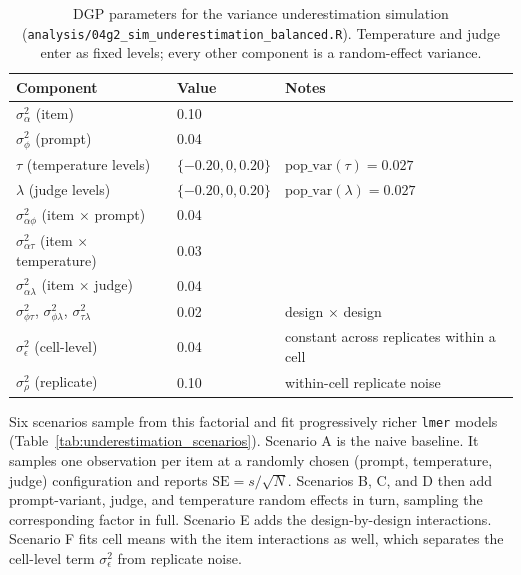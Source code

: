 \begin{table}[h]
\centering
\small
\caption{DGP parameters for the variance underestimation simulation (\texttt{analysis/04g2\_sim\_underestimation\_balanced.R}). Temperature and judge enter as fixed levels; every other component is a random-effect variance.}
\label{tab:underestimation_dgp}
\begin{tabular}{lll}
\toprule
\textbf{Component} & \textbf{Value} & \textbf{Notes} \\
\midrule
$\sigma^2_\alpha$ (item)            & 0.10 & \\
$\sigma^2_\phi$ (prompt)            & 0.04 & \\
$\tau$ (temperature levels)         & $\{-0.20, 0, 0.20\}$ & $\mathrm{pop\_var}(\tau) = 0.027$ \\
$\lambda$ (judge levels)            & $\{-0.20, 0, 0.20\}$ & $\mathrm{pop\_var}(\lambda) = 0.027$ \\
$\sigma^2_{\alpha\phi}$ (item $\times$ prompt) & 0.04 & \\
$\sigma^2_{\alpha\tau}$ (item $\times$ temperature) & 0.03 & \\
$\sigma^2_{\alpha\lambda}$ (item $\times$ judge) & 0.04 & \\
$\sigma^2_{\phi\tau}$, $\sigma^2_{\phi\lambda}$, $\sigma^2_{\tau\lambda}$ & 0.02 & design $\times$ design \\
$\sigma^2_\epsilon$ (cell-level)    & 0.04 & constant across replicates within a cell \\
$\sigma^2_\rho$ (replicate)         & 0.10 & within-cell replicate noise \\
\bottomrule
\end{tabular}
\end{table}

Six scenarios sample from this factorial and fit progressively richer \texttt{lmer} models (Table~\ref{tab:underestimation_scenarios}). Scenario A is the naive baseline. It samples one observation per item at a randomly chosen (prompt, temperature, judge) configuration and reports $\mathrm{SE} = s/\sqrt{N}$. Scenarios B, C, and D then add prompt-variant, judge, and temperature random effects in turn, sampling the corresponding factor in full. Scenario E adds the design-by-design interactions. Scenario F fits cell means with the item interactions as well, which separates the cell-level term $\sigma^2_\epsilon$ from replicate noise.

